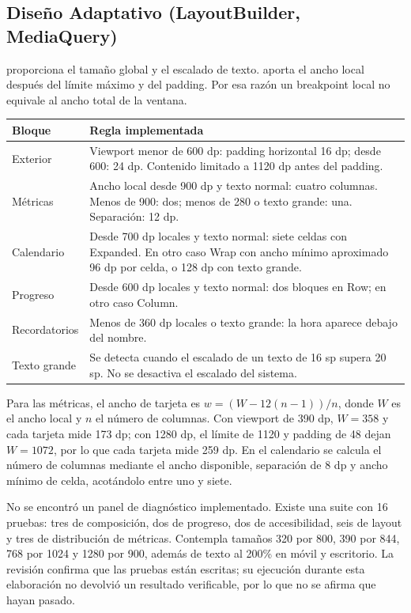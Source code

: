 \documentclass[12pt,a4paper]{article}
\newcommand{\codigo}[1]{\texttt{\detokenize{#1}}}
\begin{document}
\subsection{Diseño Adaptativo (LayoutBuilder, MediaQuery)}
\codigo{MediaQuery} proporciona el tamaño global y el escalado de texto. \codigo{LayoutBuilder} aporta el ancho local después del límite máximo y del padding. Por esa razón un breakpoint local no equivale al ancho total de la ventana.
\begin{longtable}{p{3cm}p{10.5cm}}
\textbf{Bloque} & \textbf{Regla implementada}\\\hline
Exterior & Viewport menor de 600 dp: padding horizontal 16 dp; desde 600: 24 dp. Contenido limitado a 1120 dp antes del padding.\\
Métricas & Ancho local desde 900 dp y texto normal: cuatro columnas. Menos de 900: dos; menos de 280 o texto grande: una. Separación: 12 dp.\\
Calendario & Desde 700 dp locales y texto normal: siete celdas con Expanded. En otro caso Wrap con ancho mínimo aproximado 96 dp por celda, o 128 dp con texto grande.\\
Progreso & Desde 600 dp locales y texto normal: dos bloques en Row; en otro caso Column.\\
Recordatorios & Menos de 360 dp locales o texto grande: la hora aparece debajo del nombre.\\
Texto grande & Se detecta cuando el escalado de un texto de 16 sp supera 20 sp. No se desactiva el escalado del sistema.\\\hline
\end{longtable}
Para las métricas, el ancho de tarjeta es $w=(W-12(n-1))/n$, donde $W$ es el ancho local y $n$ el número de columnas. Con viewport de 390 dp, $W=358$ y cada tarjeta mide 173 dp; con 1280 dp, el límite de 1120 y padding de 48 dejan $W=1072$, por lo que cada tarjeta mide 259 dp. En el calendario se calcula el número de columnas mediante el ancho disponible, separación de 8 dp y ancho mínimo de celda, acotándolo entre uno y siete.

No se encontró un panel de diagnóstico implementado. Existe una suite con 16 pruebas: tres de composición, dos de progreso, dos de accesibilidad, seis de layout y tres de distribución de métricas. Contempla tamaños 320 por 800, 390 por 844, 768 por 1024 y 1280 por 900, además de texto al 200\% en móvil y escritorio. La revisión confirma que las pruebas están escritas; su ejecución durante esta elaboración no devolvió un resultado verificable, por lo que no se afirma que hayan pasado.
\end{document}

